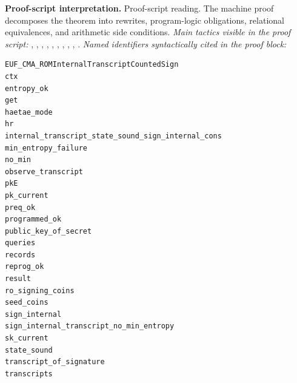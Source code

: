 \begin{formaltheorem}
\noindent\textbf{Proof-script interpretation.}
Proof-script reading. The machine proof decomposes the theorem into rewrites, program-logic obligations, relational equivalences, and arithmetic side conditions.
\emph{Main tactics visible in the proof script:} , , , , , , , , , .
\emph{Named identifiers syntactically cited in the proof block:}
\begin{lstlisting}[language=EasyCrypt,basicstyle=\ttfamily\scriptsize]
EUF_CMA_ROMInternalTranscriptCountedSign
ctx
entropy_ok
get
haetae_mode
hr
internal_transcript_state_sound_sign_internal_cons
min_entropy_failure
no_min
observe_transcript
pkE
pk_current
preq_ok
programmed_ok
public_key_of_secret
queries
records
reprog_ok
result
ro_signing_coins
seed_coins
sign_internal
sign_internal_transcript_no_min_entropy
sk_current
state_sound
transcript_of_signature
transcripts
\end{lstlisting}

\end{formaltheorem}

